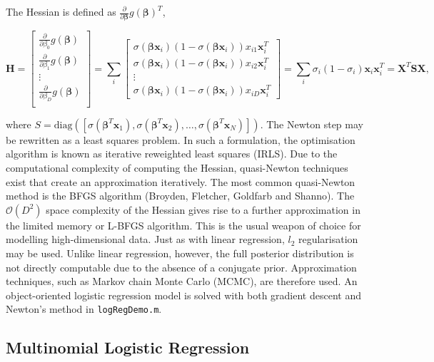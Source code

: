 \documentclass[11pt]{amsart}
\begin{document}
The Hessian is defined as $\frac{\partial}{\partial\mathbf{\boldsymbol\beta}}g(\boldsymbol\beta)^T$,

$$\mathbf{H} = \begin{bmatrix}
\frac{\partial}{\partial \beta_0} g(\boldsymbol\beta) \\
\frac{\partial}{\partial \beta_1} g(\boldsymbol\beta) \\
\vdots \\
\frac{\partial}{\partial \beta_D} g(\boldsymbol\beta) \\
\end{bmatrix} =
\sum_i\begin{bmatrix}
\sigma(\boldsymbol\beta\mathbf{x}_i)(1 - \sigma(\boldsymbol\beta\mathbf{x}_i))x_{i1}\mathbf{x}_i^T \\
\sigma(\boldsymbol\beta\mathbf{x}_i)(1 - \sigma(\boldsymbol\beta\mathbf{x}_i))x_{i2}\mathbf{x}_i^T \\
\vdots \\
\sigma(\boldsymbol\beta\mathbf{x}_i)(1 - \sigma(\boldsymbol\beta\mathbf{x}_i))x_{iD}\mathbf{x}_i^T
\end{bmatrix}
= \sum_i \sigma_i(1 - \sigma_i)\mathbf{x}_i\mathbf{x}_i^T = \mathbf{X}^T\mathbf{S}\mathbf{X},
$$

where $S = \text{diag}([\sigma(\boldsymbol\beta^T\mathbf{x}_1), \sigma(\boldsymbol\beta^T\mathbf{x}_2), \dots, \sigma(\boldsymbol\beta^T\mathbf{x}_N)])$. The Newton step may be rewritten as a least squares problem. In such a formulation, the optimisation algorithm is known as iterative reweighted least squares (IRLS). Due to the computational complexity of computing the Hessian, quasi-Newton techniques exist that create an approximation iteratively. The most common quasi-Newton method is the BFGS algorithm (Broyden, Fletcher, Goldfarb and Shanno). The $\mathcal{O}(D^2)$ space complexity of the Hessian gives rise to a further approximation in the limited memory or L-BFGS algorithm. This is the usual weapon of choice for modelling high-dimensional data. Just as with linear regression, $l_2$ regularisation may be used. Unlike linear regression, however, the full posterior distribution is not directly computable due to the absence of a conjugate prior. Approximation techniques, such as Markov chain Monte Carlo (MCMC), are therefore used. An object-oriented logistic regression model is solved with both gradient descent and Newton's method in \texttt{logRegDemo.m}.

\subsection{Multinomial Logistic Regression}
\end{document}

